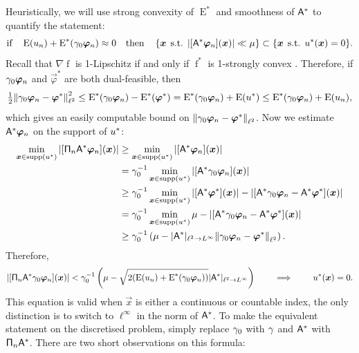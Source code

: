 \documentclass[smallextended]{svjour3}
\newcommand{\norm}[1]{{\left\lVert #1 \right\rVert}}
\newcommand{\op}[1]{\operatorname{#1}}
\newcommand{\1}{\F{1}}
\DeclareMathOperator{\st}{\;s.t.\;}
\DeclareMathOperator{\supp}{supp}
\newcommand*{\var}[1]{%
	\IfEqCase{#1}{%
		{0}{u}%
		{1}{v}%
		{2}{w}%
	}[u#1]%
}
\newcommand*{\vars}[1]{%
	\IfEqCase{#1}{%
		{0}{\alpha}%
		{1}{\beta}%
		{2}{\gamma}%
		{3}{a}%
		{4}{b}%
		{5}{c}%
	}[k#1]%
}
\begin{document}
	Heuristically, we will use strong convexity of $\op{E}^*$ and smoothness of $\mathsf{A}^*$ to quantify the statement:
	$$ \text{if}\quad \op{E}(\var0_n) + \op{E}^*(\vars2_0 \vec{\varphi}_n) \approx 0 \quad \text{then}\quad \left\{\vec{x}\st |[\A^*\vec{\varphi}_n](\vec{x})|\ll \mu\right\} \subset\{\vec{x} \st \var0^*(\vec{x})=0\}.$$
	Recall that $\nabla\op{f}$ is 1-Lipschitz if and only if $\op{f}^*$ is 1-strongly convex \cite[Chapter 10, Thm. 4.2.2]{Hiriart2013}. Therefore, if $\vars2_0\vec{\varphi}_n$ and $\vec{\varphi}^*$ are both dual-feasible, then
	\begin{equation}
		\tfrac12\norm{\vars2_0\vec{\varphi}_n-\vec{\varphi}^*}_{\ell^2}^2 \leq \op{E}^*(\vars2_0\vec{\varphi}_n) - \op{E}^*(\vec{\varphi}^*) = \op{E}^*(\vars2_0\vec{\varphi}_n) + \op{E}(\var0^*) \leq \op{E}^*(\vars2_0\vec{\varphi}_n) + \op{E}(\var0_n),
	\end{equation}
	which gives an easily computable bound on $\norm{\vars2_0\vec{\varphi}_n-\vec{\varphi}^*}_{\ell^2}$. Now we estimate $\A^*\vec{\varphi}_n$ on the support of $\var0^*$:
	\begin{align}
		\min_{\vec{x}\in\supp(\var0^*)} |[\tens{\Pi}_n\A^*\vec{\varphi}_n](\vec{x})| &\geq \min_{\vec{x}\in\supp(\var0^*)} |[\A^*\vec{\varphi}_n](\vec{x})|
		\\&= \vars2_0^{-1}\min_{\vec{x}\in\supp(\var0^*)} |[\A^*\vars2_0 \vec{\varphi}_n](\vec{x})|
		\\&\geq \vars2_0^{-1}\min_{\vec{x}\in\supp(\var0^*)} |[\A^*\vec{\varphi}^*](\vec{x})| - |[\A^*\vars2_0 \vec{\varphi}_n-\A^*\vec{\varphi}^*](\vec{x})|
		\\&= \vars2_0^{-1}\min_{\vec{x}\in\supp(\var0^*)} \mu - |[\A^*\vars2_0 \vec{\varphi}_n-\A^*\vec{\varphi}^*](\vec{x})|
		\\&\geq \vars2_0^{-1}\left(\mu - |\A^*|_{\ell^2\to L^\infty}\norm{\vars2_0 \vec{\varphi}_n-\vec{\varphi}^*}_{\ell^2}\right).
	\end{align}
	Therefore,
	\begin{equation}
		|[\tens{\Pi}_n\A^*\vars2_0\vec{\varphi}_n](\vec{x})|< \vars2_0^{-1}\left(\mu - \sqrt{2(\op{E}(\var0_n)+\op{E}^*(\vars2_0\vec{\varphi}_n))}|\A^*|_{\ell^2\to L^\infty}\right) \qquad \implies \qquad \var0^*(\vec{x})= 0.\label{eq: support equation}
	\end{equation}
	This equation is valid when $\vec{x}$ is either a continuous or countable index, the only distinction is to switch to $\ell^\infty$ in the norm of $\mathsf{A}^*$. To make the equivalent statement on the discretised problem, simply replace $\vars2_0$ with $\vars2$ and $\mathsf{A}^*$ with $\mathsf{\Pi}_n\mathsf{A}^*$. There are two short observations on this formula:
\end{document}
